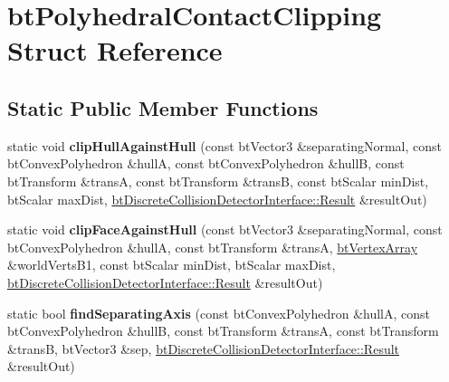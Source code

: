 \hypertarget{structbtPolyhedralContactClipping}{}\section{bt\+Polyhedral\+Contact\+Clipping Struct Reference}
\label{structbtPolyhedralContactClipping}
\subsection*{Static Public Member Functions}
\begin{DoxyCompactItemize}
\item 
\mbox{\label{structbtPolyhedralContactClipping_af26bb1efeae5c9ac16f980f68967cfdc}} 
static void {\bfseries clip\+Hull\+Against\+Hull} (const bt\+Vector3 \&separating\+Normal, const bt\+Convex\+Polyhedron \&hullA, const bt\+Convex\+Polyhedron \&hullB, const bt\+Transform \&transA, const bt\+Transform \&transB, const bt\+Scalar min\+Dist, bt\+Scalar max\+Dist, \hyperlink{structbtDiscreteCollisionDetectorInterface_1_1Result}{bt\+Discrete\+Collision\+Detector\+Interface\+::\+Result} \&result\+Out)
\item 
\mbox{\label{structbtPolyhedralContactClipping_a553be63ab7b19085f37f103ed9276cb7}} 
static void {\bfseries clip\+Face\+Against\+Hull} (const bt\+Vector3 \&separating\+Normal, const bt\+Convex\+Polyhedron \&hullA, const bt\+Transform \&transA, \hyperlink{classbtAlignedObjectArray}{bt\+Vertex\+Array} \&world\+Verts\+B1, const bt\+Scalar min\+Dist, bt\+Scalar max\+Dist, \hyperlink{structbtDiscreteCollisionDetectorInterface_1_1Result}{bt\+Discrete\+Collision\+Detector\+Interface\+::\+Result} \&result\+Out)
\item 
\mbox{\label{structbtPolyhedralContactClipping_ad5f81176a891d4face2c9954e3a690b3}} 
static bool {\bfseries find\+Separating\+Axis} (const bt\+Convex\+Polyhedron \&hullA, const bt\+Convex\+Polyhedron \&hullB, const bt\+Transform \&transA, const bt\+Transform \&transB, bt\+Vector3 \&sep, \hyperlink{structbtDiscreteCollisionDetectorInterface_1_1Result}{bt\+Discrete\+Collision\+Detector\+Interface\+::\+Result} \&result\+Out)
\item 
\mbox{\label{structbtPolyhedralContactClipping_a1ab4d8cdb0e9cce0dbba7843c29c0f0d}} 

\end{DoxyCompactItemize}
